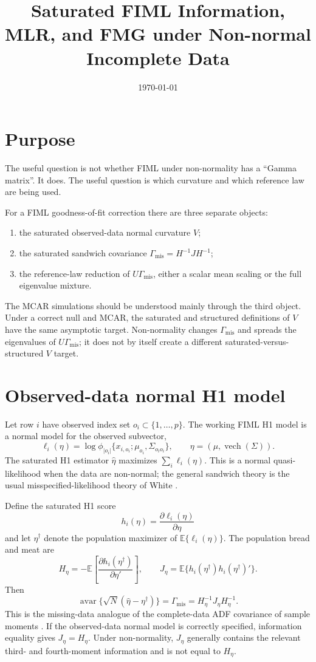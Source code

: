\documentclass[11pt]{article}
\title{Saturated FIML Information, MLR, and FMG under Non-normal
Incomplete Data}
\author{}
\date{\today}
\newcommand{\E}{\mathbb{E}}
\newcommand{\avar}{\operatorname{avar}}
\newcommand{\vech}{\operatorname{vech}}
\begin{document}
\maketitle

\section*{Purpose}

The useful question is not whether FIML under non-normality has a ``Gamma
matrix''. It does. The useful question is which curvature and which reference
law are being used.

For a FIML goodness-of-fit correction there are three separate objects:
\begin{enumerate}
  \item the saturated observed-data normal curvature \(V\);
  \item the saturated sandwich covariance
        \(\Gamma_{\mathrm{mis}} = H^{-1}JH^{-1}\);
  \item the reference-law reduction of \(U\Gamma_{\mathrm{mis}}\), either a
        scalar mean scaling or the full eigenvalue mixture.
\end{enumerate}
The MCAR simulations should be understood mainly through the third object.
Under a correct null and MCAR, the saturated and structured definitions of
\(V\) have the same asymptotic target. Non-normality changes
\(\Gamma_{\mathrm{mis}}\) and spreads the eigenvalues of
\(U\Gamma_{\mathrm{mis}}\); it does not by itself create a different
saturated-versus-structured \(V\) target.

\section*{Observed-data normal H1 model}

Let row \(i\) have observed index set \(o_i \subset \{1,\ldots,p\}\). The
working FIML H1 model is a normal model for the observed subvector,
\[
  \ell_i(\eta)
    =
  \log \phi_{|o_i|}
    \{x_{i,o_i}; \mu_{o_i}, \Sigma_{o_i o_i}\},
  \qquad
  \eta = (\mu, \vech(\Sigma)).
\]
The saturated H1 estimator \(\hat\eta\) maximizes
\(\sum_i \ell_i(\eta)\). This is a normal quasi-likelihood when the data are
non-normal; the general sandwich theory is the usual misspecified-likelihood
theory of White \cite{white1982}.

Define the saturated H1 score
\[
  h_i(\eta) = \frac{\partial \ell_i(\eta)}{\partial \eta}
\]
and let \(\eta^\dagger\) denote the population maximizer of
\(\E\{\ell_i(\eta)\}\). The population bread and meat are
\[
  H_\eta
    =
  -\E\left[
    \frac{\partial h_i(\eta^\dagger)}{\partial\eta'}
  \right],
  \qquad
  J_\eta
    =
  \E\{h_i(\eta^\dagger)h_i(\eta^\dagger)'\}.
\]
Then
\[
  \avar\{\sqrt N(\hat\eta-\eta^\dagger)\}
    =
  \Gamma_{\mathrm{mis}}
    =
  H_\eta^{-1}J_\eta H_\eta^{-1}.
\]
This is the missing-data analogue of the complete-data ADF covariance of
sample moments \cite{browne1984}. If the observed-data normal model is
correctly specified, information equality gives \(J_\eta = H_\eta\). Under
non-normality, \(J_\eta\) generally contains the relevant third- and
fourth-moment information and is not equal to \(H_\eta\).
\end{document}
